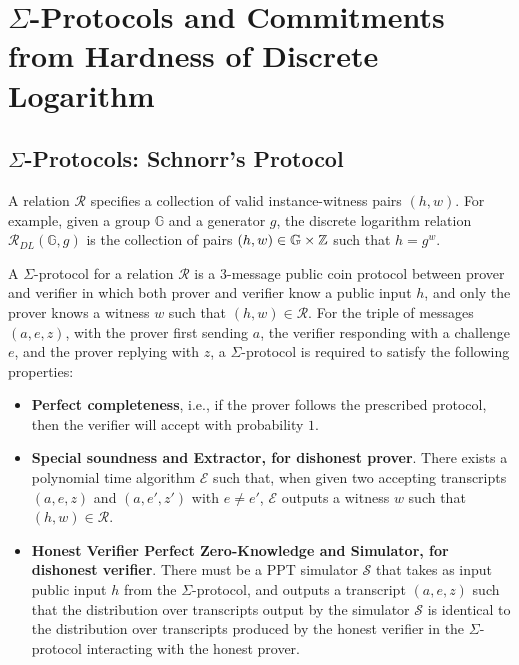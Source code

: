 \documentclass{article}
\begin{document}
\section{$\Sigma$-Protocols and Commitments from Hardness of Discrete Logarithm}

\subsection{$\Sigma$-Protocols: Schnorr's Protocol}

A relation $\mathcal{R}$ specifies a collection of valid instance-witness pairs $(h, w)$. For example, given a group $\mathbb{G}$ and a generator $g$, the discrete logarithm relation $\mathcal{R}_{DL}(\mathbb{G}, g)$ is the collection of pairs $(h, w) \in \mathbb{G} \times \mathbb{Z}$ such that $h = g^w$. 

\begin{boxx1}
A $\Sigma$-protocol for a relation $\mathcal{R}$ is a $3$-message public coin protocol between prover and verifier in which both prover and verifier know a public input $h$, and only the prover knows a witness $w$ such that $(h, w) \in \mathcal{R}$. For the triple of messages $(a, e, z)$, with the prover first sending $a$, the verifier responding with a challenge $e$, and the prover replying with $z$, a $\Sigma$-protocol is required to satisfy the following properties: 
\begin{itemize}
\item \textbf{Perfect completeness}, i.e., if the prover follows the prescribed protocol, then the verifier will accept with probability $1$. 
\item \textbf{Special soundness and Extractor, for dishonest prover}. There exists a polynomial time algorithm $\mathcal{E}$ such that, when given two accepting transcripts $(a, e, z)$ and $(a, e', z')$ with $e \neq e'$, $\mathcal{E}$ outputs a witness $w$ such that $(h, w) \in \mathcal{R}$. 
\item \textbf{Honest Verifier Perfect Zero-Knowledge and Simulator, for dishonest verifier}. There must be a PPT simulator $\mathcal{S}$ that takes as input public input $h$ from the $\Sigma$-protocol, and outputs a transcript $(a, e, z)$ such that the distribution over transcripts output by the simulator $\mathcal{S}$ is identical to the distribution over transcripts produced by the honest verifier in the $\Sigma$-protocol interacting with the honest prover. 
\end{itemize}
\end{boxx1}
\end{document}
